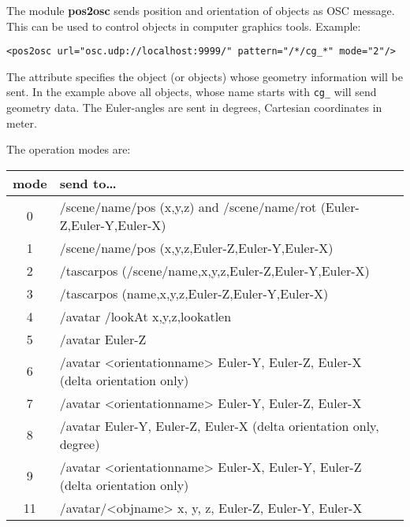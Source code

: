 The module {\bf pos2osc} sends position and orientation of \tascar{}
objects as OSC message. This can be used to control objects in
computer graphics tools. Example:
\begin{lstlisting}[numbers=none]
<pos2osc url="osc.udp://localhost:9999/" pattern="/*/cg_*" mode="2"/>
\end{lstlisting}
The  attribute specifies the object (or objects) whose geometry information will be sent.
%
In the example above all objects, whose name starts with \verb!cg_! will send geometry data.
%
The Euler-angles are sent in degrees, Cartesian coordinates in meter. 



The operation modes are:

{\small
\begin{tabular}{cl}
mode & send to\dots                                                                 \\
\hline
0    & /scene/name/pos (x,y,z) and /scene/name/rot (Euler-Z,Euler-Y,Euler-X)        \\
1    & /scene/name/pos (x,y,z,Euler-Z,Euler-Y,Euler-X)                              \\
2    & /tascarpos (/scene/name,x,y,z,Euler-Z,Euler-Y,Euler-X)                       \\
3    & /tascarpos (name,x,y,z,Euler-Z,Euler-Y,Euler-X)                              \\
4    & /avatar /lookAt x,y,z,lookatlen                                              \\
5    & /avatar Euler-Z                                                              \\
6    & /avatar <orientationname> Euler-Y, Euler-Z, Euler-X (delta orientation only) \\
7    & /avatar <orientationname> Euler-Y, Euler-Z, Euler-X                          \\
8    & /avatar Euler-Y, Euler-Z, Euler-X (delta orientation only, degree)           \\
9    & /avatar <orientationname> Euler-X, Euler-Y, Euler-Z (delta orientation only) \\
11   & /avatar/<objname> x, y, z, Euler-Z, Euler-Y, Euler-X                         \\
\end{tabular}
}
